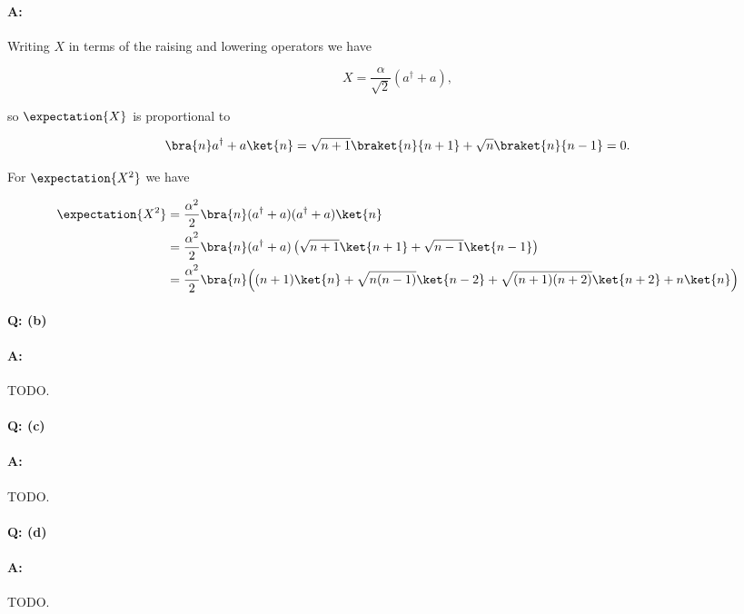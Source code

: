 \paragraph{A:}

Writing $X$ in terms of the raising and lowering operators we have

\begin{equation}\label{eqn:qmIexamPractice2008Dec:3:100}
X = \frac{\alpha}{\sqrt{2}} (a^\dagger + a),
\end{equation}

so $\expectation{X}$ is proportional to 

\begin{equation}\label{eqn:qmIexamPractice2008Dec:3:110}
\bra{n} a^\dagger + a \ket{n} = \sqrt{n+1} \braket{n}{n+1} + \sqrt{n} \braket{n}{n-1} = 0.
\end{equation}

For $\expectation{X^2}$ we have

\begin{align*}
\expectation{X^2}
&=
\frac{\alpha^2}{2}
\bra{n} (a^\dagger + a)(a^\dagger + a) \ket{n} \\
&=
\frac{\alpha^2}{2}
\bra{n} (a^\dagger + a) \left( 
\sqrt{n+1} \ket{n+1} + \sqrt{n-1} \ket{n-1}
\right)  \\
&=
\frac{\alpha^2}{2}
\bra{n} 
\Bigl( (n+1) \ket{n} + \sqrt{n(n-1)} \ket{n-2}
+ \sqrt{(n+1)(n+2)} \ket{n+2} + n \ket{n} \Bigr)
\end{align*}

\paragraph{Q: (b)}

\paragraph{A:}

TODO.

\paragraph{Q: (c)}
\paragraph{A:}

TODO.

\paragraph{Q: (d)}
\paragraph{A:}

TODO.

\EndNoBibArticle
